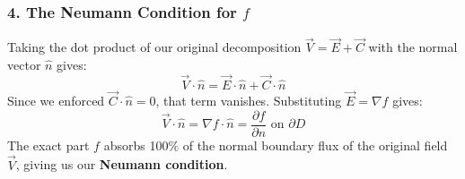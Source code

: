 \documentclass[11pt]{article}
\begin{document}
\subsubsection*{4. The Neumann Condition for $f$}
Taking the dot product of our original decomposition $\vec{V} = \vec{E} + \vec{C}$ with the normal vector $\hat{n}$ gives:
\[ \vec{V} \cdot \hat{n} = \vec{E} \cdot \hat{n} + \vec{C} \cdot \hat{n} \]
Since we enforced $\vec{C} \cdot \hat{n} = 0$, that term vanishes. Substituting $\vec{E} = \nabla f$ gives:
\[ \vec{V} \cdot \hat{n} = \nabla f \cdot \hat{n} = \frac{\partial f}{\partial n} \text{ on } \partial D \]
The exact part $f$ absorbs 100\% of the normal boundary flux of the original field $\vec{V}$, giving us our \textbf{Neumann condition}.

\vspace{1em}
\end{document}

